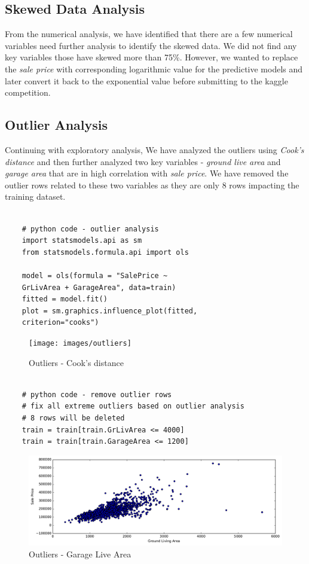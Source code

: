 \documentclass[sigconf]{acmart}
\begin{document}
	\subsection{Skewed Data Analysis}
	From the numerical analysis, we have identified that there are a few numerical variables need further analysis to identify the skewed data. We did not find any key variables those have skewed more than 75\%. However, we wanted to replace the {\em sale price} with corresponding logarithmic value for the predictive models and later convert it back to the exponential value before submitting to the kaggle competition. 
	
	\subsection{Outlier Analysis}
	
	Continuing with exploratory analysis, We have analyzed the outliers using {\em Cook's distance} and then further analyzed two key variables - {\em ground live area} and {\em garage area} that are in high correlation with {\em sale price}. We have removed the outlier rows related to these two variables as they are only 8 rows impacting the training dataset.
	
	\begin{verbatim}
	
	# python code - outlier analysis
	import statsmodels.api as sm
	from statsmodels.formula.api import ols
	
	model = ols(formula = "SalePrice ~ 
	GrLivArea + GarageArea", data=train)
	fitted = model.fit()    	
	plot = sm.graphics.influence_plot(fitted, 
	criterion="cooks")		
	\end{verbatim}
	
	\begin{figure}[H]
		\centering
		\texttt{[image: images/outliers]}	
		\caption{Outliers - Cook's distance} \label{fig:outliers} 
	\end{figure}
	
	\begin{verbatim}
	
	# python code - remove outlier rows
	# fix all extreme outliers based on outlier analysis
	# 8 rows will be deleted
	train = train[train.GrLivArea <= 4000]
	train = train[train.GarageArea <= 1200]
	\end{verbatim}
	
	\begin{figure}[H]
		\centering
		\includegraphics[width=.95\columnwidth]{images/gr_liv_area_outlier}	
		\caption{Outliers - Garage Live Area} \label{fig:gr_liv_area_outlier} 
	\end{figure}
	
\end{document}
